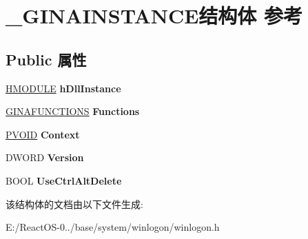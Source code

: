 \hypertarget{struct___g_i_n_a_i_n_s_t_a_n_c_e}{}\section{\+\_\+\+G\+I\+N\+A\+I\+N\+S\+T\+A\+N\+C\+E结构体 参考}
\label{struct___g_i_n_a_i_n_s_t_a_n_c_e}
\subsection*{Public 属性}
\begin{DoxyCompactItemize}
\item 
\mbox{\label{struct___g_i_n_a_i_n_s_t_a_n_c_e_a99071023b8b61fd5a55e251134041b94}} 
\hyperlink{interfacevoid}{H\+M\+O\+D\+U\+LE} {\bfseries h\+Dll\+Instance}
\item 
\mbox{\label{struct___g_i_n_a_i_n_s_t_a_n_c_e_ac360a64bf5a98523ccf188af7659e7bd}} 
\hyperlink{struct___g_i_n_a_f_u_n_c_t_i_o_n_s}{G\+I\+N\+A\+F\+U\+N\+C\+T\+I\+O\+NS} {\bfseries Functions}
\item 
\mbox{\label{struct___g_i_n_a_i_n_s_t_a_n_c_e_a963b22d58ea7368b60ad3f783d6f13e2}} 
\hyperlink{interfacevoid}{P\+V\+O\+ID} {\bfseries Context}
\item 
\mbox{\label{struct___g_i_n_a_i_n_s_t_a_n_c_e_ae874481fe128a00a9415e46ade5c9e99}} 
D\+W\+O\+RD {\bfseries Version}
\item 
\mbox{\label{struct___g_i_n_a_i_n_s_t_a_n_c_e_ac60e98554680cf5f64f6fc7bb7c00025}} 
B\+O\+OL {\bfseries Use\+Ctrl\+Alt\+Delete}
\end{DoxyCompactItemize}


该结构体的文档由以下文件生成\+:\begin{DoxyCompactItemize}
\item 
E\+:/\+React\+O\+S-\/0../base/system/winlogon/winlogon.\+h\end{DoxyCompactItemize}
